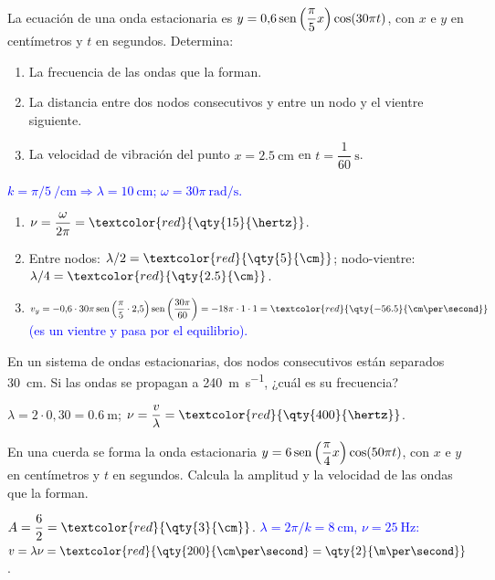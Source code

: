 \begin{exercise}
    La ecuación de una onda estacionaria es \(y = 0{,}6\operatorname{sen}\left(\dfrac{\pi}{5}x\right)\cos(30\pi t)\), con \(x\) e \(y\) en
    centímetros y \(t\) en segundos. Determina:
    \begin{enumerate}[label=\letraminuscula]
        \item La frecuencia de las ondas que la forman.
        \item La distancia entre dos nodos consecutivos y entre un nodo y el vientre siguiente.
        \item La velocidad de vibración del punto \(x = \qty{2.5}{\cm}\) en \(t = \dfrac{1}{60}\ \unit{\second}\).
    \end{enumerate}
    \begin{solu}
        \textcolor{blue}{\(k = \pi/5\ \unit{\per\cm} \Rightarrow \lambda = \qty{10}{\cm}\); \(\omega = 30\pi\ \unit{\radian\per\second}\).}
        \begin{enumerate}[label=\letraminuscula]
            \item \(\nu = \dfrac{\omega}{2\pi} = \textcolor{red}{\qty{15}{\hertz}}\).
            \item Entre nodos: \(\lambda/2 = \textcolor{red}{\qty{5}{\cm}}\); nodo-vientre: \(\lambda/4 = \textcolor{red}{\qty{2.5}{\cm}}\).
            \item \(v_y = -0{,}6\cdot 30\pi\sen\left(\dfrac{\pi}{5}\cdot 2{,}5\right)\sen\left(\dfrac{30\pi}{60}\right) = -18\pi\cdot 1\cdot 1 = \textcolor{red}{\qty{-56.5}{\cm\per\second}}\)
            \textcolor{blue}{(es un vientre y pasa por el equilibrio).}
        \end{enumerate}
    \end{solu}
\end{exercise}

\begin{exercise}
    En un sistema de ondas estacionarias, dos nodos consecutivos están separados \qty{30}{\cm}. Si las ondas se propagan a
    \qty{240}{\m\per\second}, ¿cuál es su frecuencia?
    \begin{solu}
        \(\lambda = 2\cdot 0{,}30 = \qty{0.6}{\m}\); \(\nu = \dfrac{v}{\lambda} = \textcolor{red}{\qty{400}{\hertz}}\).
    \end{solu}
\end{exercise}

\begin{exercise}
    En una cuerda se forma la onda estacionaria \(y = 6\operatorname{sen}\left(\dfrac{\pi}{4}x\right)\cos(50\pi t)\), con \(x\) e \(y\) en
    centímetros y \(t\) en segundos. Calcula la amplitud y la velocidad de las ondas que la forman.
    \begin{solu}
        \(A = \dfrac{6}{2} = \textcolor{red}{\qty{3}{\cm}}\). \textcolor{blue}{\(\lambda = 2\pi/k = \qty{8}{\cm}\), \(\nu = \qty{25}{\hertz}\):}
        \(v = \lambda\nu = \textcolor{red}{\qty{200}{\cm\per\second} = \qty{2}{\m\per\second}}\).
    \end{solu}
\end{exercise}

